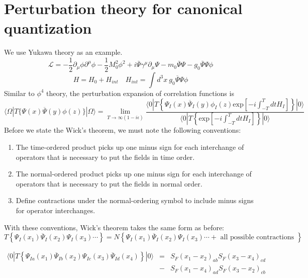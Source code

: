 \documentclass[cyan]{elegantnote}
\begin{document}
\section{Perturbation theory for canonical quantization}
\noindent
We use Yukawa theory as an example.
\[\mathcal{L} = -\frac{1}{2}\partial_{\mu} \phi \partial^{\mu} \phi -\frac{1}{2}M_0^2 \phi^2 + i\overline{\Psi} \gamma^{\mu} \partial_{\mu} \Psi - m_0\overline{\Psi}\Psi -g_0 \overline{\Psi}\Psi\phi\]
\[H = H_0 + H_{int} \quad H_{int} = \int d^3 x \: g_0 \overline{\Psi}\Psi\phi \]
Similar to $\phi^4$ theory, the perturbation expansion of correlation functions is
\[\langle \Omega | T \{\Psi(x) \overline{\Psi}(y) \phi(z) \} | \Omega \rangle = \lim_{T \to \infty(1-i\epsilon)} \frac{\langle 0 | T \left\{ \Psi_I(x) \overline{\Psi}_I(y) \phi_I(z) \mathrm{exp} \left[ -i \int_{-T}^{T} dt H_I \right]\right\} | 0 \rangle}{\langle 0 | T \left\{ \mathrm{exp} \left[ -i \int_{-T}^{T} dt H_I \right]\right\} | 0 \rangle}\]
Before we state the Wick's theorem, we must note the following conventions:
\begin{enumerate}
\item  The time-ordered product picks up one minus sign for each interchange of operators that is necessary to put the fields in time order.
\item The normal-ordered product picks up one minus sign for each interchange of operators that is necessary to put the fields in normal order.
\item Define contractions under the normal-ordering symbol to include minus signs for operator interchanges.
\end{enumerate}
With these conventions, Wick's theorem takes the same form as before:
\[T \left\{ \Psi_I(x_1) \overline{\Psi}_I(x_2)  \Psi_I(x_3) \cdots \right\} = N \left\{\Psi_I(x_1) \overline{\Psi}_I(x_2)  \Psi_I(x_3) \cdots + \mbox{ all possible contractions }\right\} \]
\begin{example}
\begin{eqnarray}
\langle 0 | T \left\{ \Psi_{Ia}(x_1) \overline{\Psi}_{Ib}(x_2) \Psi_{Ic}(x_3) \overline{\Psi}_{Id}(x_4)\right\}| 0 \rangle &=& S_F(x_1-x_2)_{ab}S_F(x_3-x_4)_{cd} \nonumber \\
&-& S_F(x_1-x_4)_{ad}S_F(x_3-x_2)_{cb} \nonumber
\end{eqnarray}
\end{example}
\end{document}

